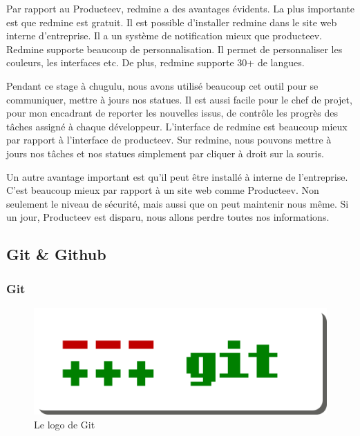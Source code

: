 Par rapport au Producteev, redmine a des avantages évidents. La plus importante est que redmine est gratuit. Il est possible d'installer redmine dans le site web interne d'entreprise. Il a un système de notification mieux que producteev. Redmine supporte beaucoup de personnalisation. Il permet de personnaliser les couleurs, les interfaces etc. De plus, redmine supporte 30+ de langues. 

Pendant ce stage à chugulu, nous avons utilisé beaucoup cet outil pour se communiquer, mettre à jours nos statues. Il est aussi facile pour le chef de projet, pour mon encadrant de reporter les nouvelles issus, de contrôle les progrès des tâches assigné à chaque développeur. L'interface de redmine est beaucoup mieux par rapport à l'interface de producteev. Sur redmine, nous pouvons mettre à jours nos tâches et nos statues simplement par cliquer à droit sur la souris. 

Un autre avantage important est qu'il peut être installé à interne de l'entreprise. C'est beaucoup mieux par rapport à un site web comme Producteev. Non seulement le niveau de sécurité, mais aussi que on peut maintenir nous même. Si un jour, Producteev est disparu, nous allons perdre toutes nos informations.



\subsection{Git \& Github} %

\subsubsection{Git} %


\begin{figure}[htbp]
	\centering
		\includegraphics[width=6in]{Image/GitLogo.png}
	\caption{Le logo de Git}
	\label{fig:Image_GitLogo}
\end{figure}

